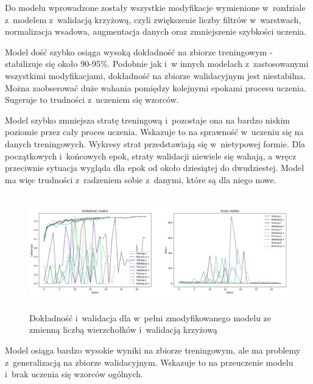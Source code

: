 Do modelu wprowadzone zostały wszystkie modyfikacje wymienione w~rozdziale z~modelem z~walidacją krzyżową,
czyli zwiększenie liczby filtrów w~warstwach, normalizacja wsadowa, augmentacja danych oraz zmniejszenie szybkości uczenia.

Model dość szybko osiąga wysoką dokładność na zbiorze treningowym - stabilizuje się około 90-95\%.
Podobnie jak i~w innych modelach z~zastosowanymi wszystkimi modyfikacjami,
dokładność na zbiorze walidacyjnym jest niestabilna.
Można zaobserować duże wahania pomiędzy kolejnymi epokami procesu uczenia.
Sugeruje to trudności z~uczeniem się wzorców.

Model szybko zmniejsza stratę treningową i~pozostaje ona na bardzo niskim poziomie przez cały proces uczenia.
Wskazuje to na sprawność w~uczeniu się na danych treningowych.
Wykresy strat przedstawiają się w~nietypowej formie.
Dla początkowych i~końcowych epok, straty walidacji niewiele się wahają,
a wręcz przeciwnie sytuacja wygląda dla epok od około dziesiątej do dwudziestej.
Model ma więc trudności z~radzeniem sobie z~danymi, które są dla niego nowe.

\begin{figure}[ht]
	\centering
	\includegraphics[height=5cm]{resources/tests/images/v4/multiple_edges_crossvalid_img.png}
	\caption{Dokładność i~walidacja dla w~pełni zmodyfikowanego modelu ze zmienną liczbą wierzchołków i~walidacją krzyżową}
	\label{Fig:tests-csvar-2a}
\end{figure}
\FloatBarrier

Model osiąga bardzo wysokie wyniki na zbiorze treningowym,
ale ma problemy z~generalizacją na zbiorze walidacyjnym.
Wskazuje to na przeuczenie modelu i~brak uczenia się wzorców ogólnych.

